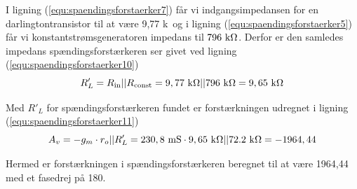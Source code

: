 I ligning (\ref{equ:spaendingsforstaerker7}) får vi indgangsimpedansen for en darlingtontransistor til at være 9,77 k\ohm~og i ligning (\ref{equ:spaendingsforstaerker5}) får vi konstantstrømsgeneratoren impedans til $796~\mathrm{k}\ohm$. Derfor er den samledes impedans spændingsforstærkeren ser givet ved ligning (\ref{equ:spaendingsforstaerker10})
\begin{equation}
\label{equ:spaendingsforstaerker10}
R'_L = R_{\mathrm{in}}||R_{\mathrm{const}} = 9,77~\mathrm{k}\ohm || 796~\mathrm{k}\ohm = 9,65~\mathrm{k}\ohm
\end{equation}  

Med $R'_L$ for spændingsforstærkeren fundet er forstærkningen udregnet i ligning (\ref{equ:spaendingsforstaerker11})
\begin{equation}
\label{equ:spaendingsforstaerker11}
A_v = -g_m \cdot r_o || R'_L = 230,8~\mathrm{mS} \cdot 9,65~\mathrm{k}\ohm || 72.2~\mathrm{k}\ohm = -1964,44
\end{equation}

Hermed er forstærkningen i spændingsforstærkeren beregnet til at være 1964,44 med et fasedrej på 180\degree .